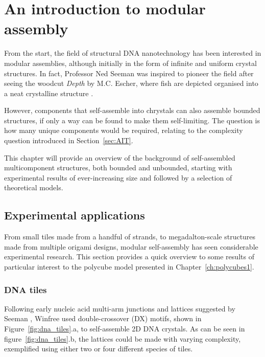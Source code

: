 
\chapter{\label{ch:polycubes_intro}An introduction to modular assembly}

\minitoc

From the start, the field of structural DNA nanotechnology has been interested in modular assemblies, although initially in the form of infinite and uniform crystal structures. In fact, Professor Ned Seeman was inspired to pioneer the field after seeing the woodcut \emph{Depth} by M.C. Escher, where fish are depicted organised into a neat crystalline structure \cite{seeman_2016}.

However, components that self-assemble into chrystals can also assemble bounded structures, if only a way can be found to make them self-limiting. The question is how many unique components would be required, relating to the complexity question introduced in Section~\ref{sec:AIT}.

This chapter will provide an overview of the background of self-assembled multicomponent structures, both bounded and unbounded, starting with experimental results of ever-increasing size and followed by a selection of theoretical models.

\section{Experimental applications} \label{sec:experimental_appl}
From small tiles made from a handful of strands, to megadalton-scale structures made from multiple origami designs, modular self-assembly has seen considerable experimental research. This section provides a quick overview to some results of particular interest to the polycube model presented in Chapter~\ref{ch:polycubes1}.

\subsection{DNA tiles}
\label{sec:dna_tiles_bricks}
Following early nucleic acid multi-arm junctions and lattices suggested by Seeman \cite{seeman1982nucleic}, Winfree \cite{winfree1998algorithmic, winfree1998design} used double-crossover (DX) motifs, shown in Figure~\ref{fig:dna_tiles}.a, to self-assemble 2D DNA crystals. As can be seen in figure~\ref{fig:dna_tiles}.b, the lattices could be made with varying complexity, exemplified using either two or four different species of tiles.

